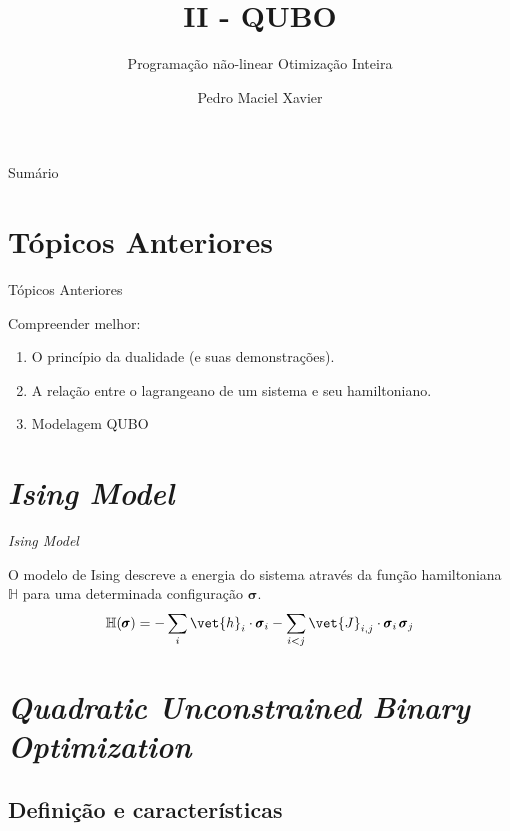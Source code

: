 \documentclass[brazil, MathSerif, aspectratio = 169]{beamer}
\author[Pedro]
{Pedro Maciel Xavier}
\title{II - QUBO}
\subtitle{\small Programação não-linear \textbullet{} Otimização Inteira}
\begin{document}
%
%
\begin{frame}%
    {Sumário}
    \tableofcontents
\end{frame}

\hidelogo

\section{Tópicos Anteriores}
\begin{frame}{Tópicos Anteriores}

    Compreender melhor:
    \begin{enumerate}%
        \item O princípio da dualidade (e suas demonstrações).

        \item A relação entre o lagrangeano de um sistema e seu hamiltoniano.
        
        \item Modelagem QUBO
    \end{enumerate}
\end{frame}

\section{\emph{Ising Model}}

\begin{frame}{\emph{Ising Model}}
    \begin{definition}
        O modelo de Ising descreve a energia do sistema através da função hamiltoniana $\mathbb{H}$ para uma determinada configuração $\pmb{\sigma}$.
        \begin{align*}
            \mathbb{H}(\pmb{\sigma}) = - \sum_{i} \vet{h}_{i} \cdot \pmb{\sigma}_i - \sum_{i < j} \vet{J}_{i, j} \cdot \pmb{\sigma}_i\,\pmb{\sigma}_j
        \end{align*}
    \end{definition}  
\end{frame}

\section{\emph{Quadratic Unconstrained Binary Optimization}}

\subsection{Definição e características}
\end{document}
